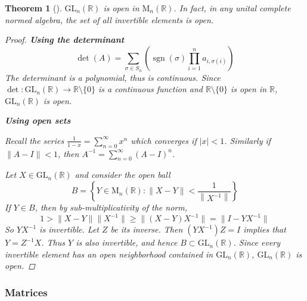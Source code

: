 \documentclass[letterpaper, 10pt]{article}
\theoremstyle{theostyle}
\newtheorem{theorem}{Theorem}[section]
\newenvironment{thmstyle}[1][]{%
    \begin{theorem}[#1]\leavevmode\vspace{-\baselineskip}\myquote%
    }{\endmyquote\end{theorem}}
\begin{document}
\begin{thmstyle}
    \(\mathrm{GL}_n ( \mathbb{R})\) is open in \(\mathrm{M}_n (\mathbb{R})\).
    In fact, in any unital complete normed algebra, the set of all invertible elements is open.

    \begin{proof}
        
        \textbf{Using the determinant}
        \[\det (A) = \sum_{\sigma \in S_n} \left( \operatorname{sgn}{(\sigma)} \prod_{i=1}^n a_{i, \sigma(i)} \right)\]
        The determinant is a polynomial, thus is continuous.
        Since \(\det : \mathrm{GL}_n (\mathbb{R}) \rightarrow \mathbb{R} \setminus \{0\}\) is a continuous function and \(\mathbb{R} \setminus \{0\}\) is open in \(\mathbb{R}\),
        \(\mathrm{GL}_n (\mathbb{R})\) is open.

        \textbf{Using open sets}

        Recall the series \(\displaystyle \frac{1}{1-x} = \sum_{n = 0}^\infty x^n\) which converges if \(\lvert x \rvert < 1\).
        Similarly if \(\lVert A - I \rVert < 1\), then \(\displaystyle A^{-1} = \sum_{n=0}^\infty (A - I)^n\).

        Let \(X \in \mathrm{GL}_n(\mathbb{R})\) and consider the open ball 
        \[B = \left\{Y \in \mathrm{M}_n(\mathbb{R}) : \lVert X - Y \rVert < \frac{1}{\left\lVert X^{-1}\right\rVert}\right\}\]
        If \(Y \in B\), then by sub-multiplicativity of the norm, 
        \[1 > \lVert X - Y \rVert \lVert X^{-1} \rVert \geq \lVert (X-Y)X^{-1}\rVert = \lVert I - YX^{-1}\rVert\]
        So \(YX^{-1}\) is invertible.
        Let \(Z\) be its inverse.
        Then
        \((YX^{-1})Z = I\) implies that \(Y = Z^{-1} X\).
        Thus \(Y\) is also invertible, and hence \(B \subset \mathrm{GL}_n(\mathbb{R})\).
        Since every invertible element has an open neighborhood contained in \(\mathrm{GL}_n(\mathbb{R})\), \(\mathrm{GL}_n(\mathbb{R})\) is open.
    \end{proof}
\end{thmstyle}

\subsubsection{Matrices}
\end{document}
